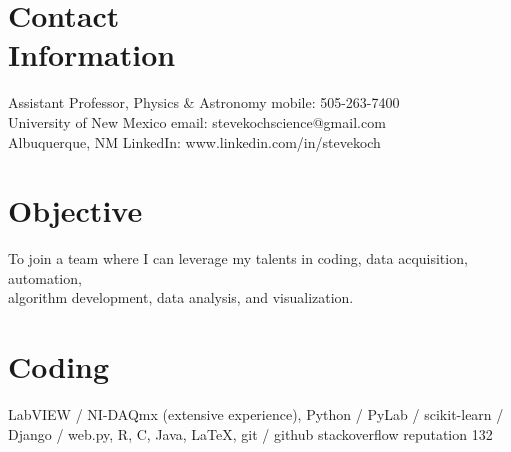 \documentclass[margin,line]{resume}
\begin{document}
\begin{resume}

    \section{\mysidestyle Contact\\Information}

    Assistant Professor, Physics \& Astronomy                \hfill mobile: 505-263-7400          \vspace{0mm}\\\vspace{0mm}%
    University of New Mexico                                \hfill email: stevekochscience@gmail.com          \vspace{0mm}\\\vspace{0mm}%
    Albuquerque, NM                                         \hfill LinkedIn: www.linkedin.com/in/stevekoch  \vspace{0mm}\\\vspace{-4.5mm}%


    \section{\mysidestyle Objective}

    To join a team where I can leverage my talents in coding, data acquisition, automation, \\ 
    algorithm development, data analysis, and visualization.

    \section{\mysidestyle Coding} 

    LabVIEW / NI-DAQmx (extensive experience), Python / PyLab / scikit-learn / Django / web.py, R, C, Java, LaTeX, git / github \newline stackoverflow reputation 132


\end{resume}
\end{document}
